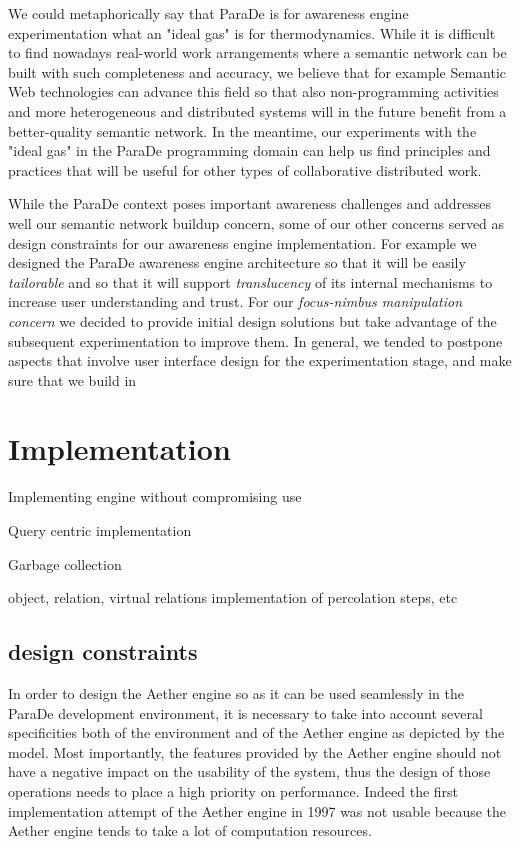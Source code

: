 \documentclass{ecscw2007}
\begin{document}
We could metaphorically say that ParaDe is for awareness engine experimentation what an "ideal gas" is for thermodynamics. While it is difficult to find nowadays real-world work arrangements where a semantic network can be built with such completeness and accuracy, we believe that for example Semantic Web technologies can advance this field so that also non-programming activities and more heterogeneous and distributed systems will in the future benefit from a better-quality semantic network. In the meantime, our experiments with the "ideal gas" in the ParaDe programming domain can help us find principles and practices that will be useful for other types of collaborative distributed work.

While the ParaDe context poses important awareness challenges and addresses well our semantic network buildup concern, some of our other concerns served as design constraints for our awareness engine implementation. For example we designed the ParaDe awareness engine architecture so that it will be easily \textit{tailorable} and so that it will support \textit{translucency} of its internal mechanisms to increase user understanding and trust. For our \textit{focus-nimbus manipulation concern} we decided to provide initial design solutions but take advantage of the subsequent experimentation to improve them. In general, we tended to postpone aspects that involve user interface design for the experimentation stage, and make sure that we build in 

\section*{Implementation} 
Implementing engine without compromising use

Query centric implementation

Garbage collection

object, relation, virtual relations
implementation of percolation steps, etc


\subsection*{design constraints}

In order to design the Aether engine so as it can be used seamlessly in the ParaDe development environment, it is necessary to take into account several specificities both of the environment and of the Aether engine as depicted by the model.
Most importantly, the features provided by the Aether engine should not have a negative impact on the usability of the system, thus the design of those operations needs to place a high priority on performance. Indeed the first implementation attempt of the Aether engine in 1997 was not usable because the Aether engine tends to take a lot of computation resources.
\end{document}
